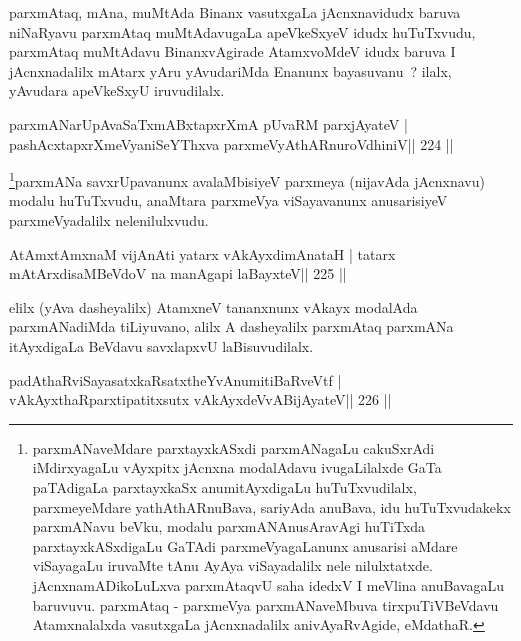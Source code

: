 \begin{artha}
parxmAtaq, mAna, muMtAda Binanx vasutxgaLa jAcnxnavidudx baruva niNaRyavu parxmAtaq muMtAdavugaLa apeVkeSxyeV idudx huTuTxvudu, parxmAtaq muMtAdavu BinanxvAgirade AtamxvoMdeV idudx baruva I jAcnxnadalilx mAtarx yAru yAvudariMda Enanunx bayasuvanu~? ilalx, yAvudara apeVkeSxyU iruvudilalx.
\end{artha}


\begin{shl}
parxmANarUpAvaSaTxmABxtapxrXmA pUvaRM parxjAyateV |
pashAcxtapxrXmeVyaniSeYThxva parxmeVyAthARnuroVdhiniV\hfill || 224 ||
\end{shl}

\begin{artha}
\footnote{parxmANaveMdare parxtayxkASxdi parxmANagaLu cakuSxrAdi iMdirxyagaLu vAyxpitx jAcnxna modalAdavu ivugaLilalxde GaTa paTAdigaLa parxtayxkaSx anumitAyxdigaLu huTuTxvudilalx, parxmeyeMdare yathAthARnuBava, sariyAda anuBava, idu huTuTxvudakekx parxmANavu beVku, modalu parxmANAnusAravAgi huTiTxda parxtayxkASxdigaLu GaTAdi parxmeVyagaLanunx anusarisi aMdare viSayagaLu iruvaMte tAnu AyAya viSayadalilx nele nilulxtatxde. jAcnxnamADikoLuLxva parxmAtaqvU saha idedxV I meVlina anuBavagaLu baruvuvu. parxmAtaq - parxmeVya parxmANaveMbuva tirxpuTiVBeVdavu Atamxnalalxda vasutxgaLa jAcnxnadalilx anivAyaRvAgide, eMdathaR.}parxmANa savxrUpavanunx avalaMbisiyeV parxmeya (nijavAda jAcnxnavu) modalu huTuTxvudu, anaMtara parxmeVya viSayavanunx anusarisiyeV parxmeVyadalilx nelenilulxvudu.
\end{artha}


\begin{shl}
AtAmx\s\s tAmxnaM vijAnAti yatarx vAkAyxdimAnataH |
tatarx mAtArxdisaMBeVdoV na manAgapi laBayxteV\hfill || 225 ||
\end{shl}

\begin{artha}
elilx (yAva dasheyalilx) AtamxneV tananxnunx vAkayx modalAda parxmANadiMda tiLiyuvano, alilx A dasheyalilx parxmAtaq parxmANa itAyxdigaLa BeVdavu savxlapxvU laBisuvudilalx.
\end{artha}

\begin{shl}
padAthaRviSayasatxkaRsatxtheYvAnumitiBaRveVtf |
vAkAyxthaRparxtipatitxsutx vAkAyxdeVvABijAyateV\hfill || 226 ||
\end{shl}

